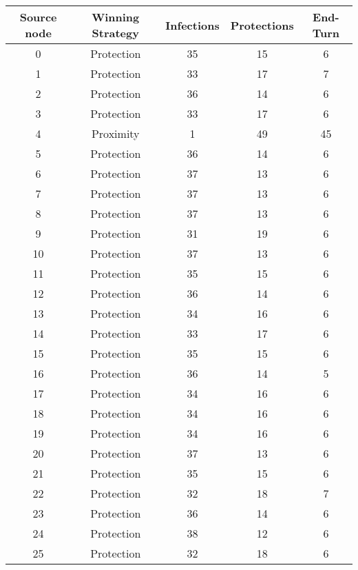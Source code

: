 \documentclass[results.tex]{subfiles}
\begin{document}
\begin{center}
  \begin{tabular}{| c || c | c | c | c |}
    \hline
    {\bfseries Source node} & {\bfseries Winning Strategy} & {\bfseries Infections} & {\bfseries Protections} & {\bfseries End-Turn} \\  %
    \hline\hline
    0 & Protection & 35 & 15 & 6 \\ 
    \hline
    1 & Protection & 33 & 17 & 7 \\ 
    \hline
    2 & Protection & 36 & 14 & 6 \\ 
    \hline
    3 & Protection & 33 & 17 & 6 \\ 
    \hline
    4 & Proximity & 1 & 49 & 45 \\ 
    \hline
    5 & Protection & 36 & 14 & 6 \\ 
    \hline
    6 & Protection & 37 & 13 & 6 \\ 
    \hline
    7 & Protection & 37 & 13 & 6 \\ 
    \hline
    8 & Protection & 37 & 13 & 6 \\ 
    \hline
    9 & Protection & 31 & 19 & 6 \\ 
    \hline
    10 & Protection & 37 & 13 & 6 \\ 
    \hline
    11 & Protection & 35 & 15 & 6 \\ 
    \hline
    12 & Protection & 36 & 14 & 6 \\ 
    \hline
    13 & Protection & 34 & 16 & 6 \\ 
    \hline
    14 & Protection & 33 & 17 & 6 \\ 
    \hline
    15 & Protection & 35 & 15 & 6 \\ 
    \hline
    16 & Protection & 36 & 14 & 5 \\ 
    \hline
    17 & Protection & 34 & 16 & 6 \\ 
    \hline
    18 & Protection & 34 & 16 & 6 \\ 
    \hline
    19 & Protection & 34 & 16 & 6 \\ 
    \hline
    20 & Protection & 37 & 13 & 6 \\ 
    \hline
    21 & Protection & 35 & 15 & 6 \\ 
    \hline
    22 & Protection & 32 & 18 & 7 \\ 
    \hline
    23 & Protection & 36 & 14 & 6 \\ 
    \hline
    24 & Protection & 38 & 12 & 6 \\ 
    \hline
    25 & Protection & 32 & 18 & 6 \\ 

\end{tabular}
\end{center}
\end{document}
